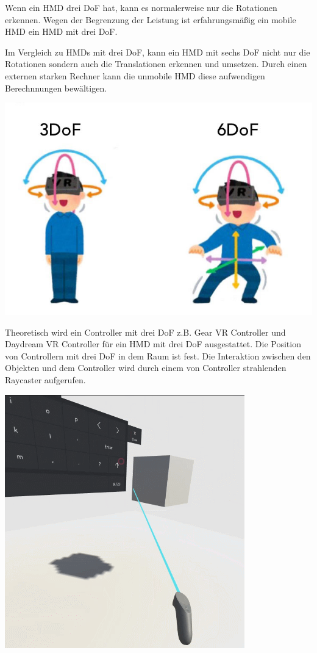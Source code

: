   Wenn ein HMD drei DoF hat, kann es normalerweise nur die Rotationen erkennen. Wegen der Begrenzung der Leistung ist erfahrungsmäßig ein mobile HMD ein HMD mit drei DoF.
  
  Im Vergleich zu HMDs mit drei DoF, kann ein HMD mit sechs DoF nicht nur die Rotationen sondern auch die Translationen erkennen und umsetzen. Durch einen externen starken Rechner kann die unmobile HMD diese aufwendigen Berechnnungen bewältigen.
  
  \includegraphics[width=\textwidth]{images/6DoF-vs-3DoF.jpg}
  
  Theoretisch wird ein Controller mit drei DoF z.B. Gear VR Controller und Daydream VR Controller für ein HMD mit drei DoF ausgestattet. Die Position von Controllern mit drei DoF in dem Raum ist fest. Die Interaktion zwischen den Objekten und dem Controller wird durch einem von Controller strahlenden Raycaster aufgerufen.

\includegraphics[width=\textwidth]{images/3dcontroller.png}
  

